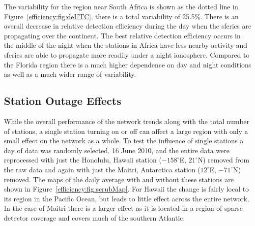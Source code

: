 The variability for the region near South Africa is shown as the dotted line in Figure~\ref{efficiency:fig:deUTC}, there is a total variability of 25.5\%.
There is an overall decrease in relative detection efficiency during the day when the sferics are propagating over the continent.
The best relative detection efficiency occurs in the middle of the night when the stations in Africa have less nearby activity and sferics are able to propagate more readily under a night ionosphere.
Compared to the Florida region there is a much higher dependence on day and night conditions as well as a much wider range of variability.

\subsection{Station Outage Effects}
\label{efficiency:section:station}

While the overall performance of the network trends along with the total number of stations, a single station turning on or off can affect a large region with only a small effect on the network as a whole.
To test the influence of single stations a day of data was randomly selected, 16 June 2010, and the entire data were reprocessed with just the Honolulu, Hawaii station ($-158^\circ$E, $21^\circ$N) removed from the raw data and again with just the Maitri, Antarctica station ($12^\circ$E, $-71^\circ$N) removed.
The maps of the daily average with and without these stations are shown in Figure~\ref{efficiency:fig:scrubMap}.
For Hawaii the change is fairly local to its region in the Pacific Ocean, but leads to little effect across the entire network.
In the case of Maitri there is a larger effect as it is located in a region of sparse detector coverage and covers much of the southern Atlantic.

